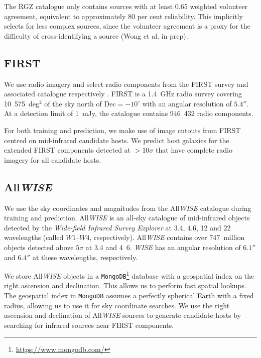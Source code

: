     The RGZ catalogue only contains sources with at least 0.65 weighted volunteer agreement, equivalent to approximately 80 per cent reliability. This implicitly selects for less complex sources, since the volunteer agreement is a proxy for the difficulty of cross-identifying a source (Wong et al. in prep).

    \subsection{FIRST} \label{sec:rlfs-first-data}

    We use radio imagery and select radio components from the FIRST survey and associated catalogue respectively \citep{white97first,helfand15first}. FIRST is a
    1.4~GHz radio survey covering 10~575~deg$^2$ of the sky north of $\mathrm{Dec} = -10^\circ$ with an angular resolution of $5.4''$. At a detection limit of $1$~mJy, the catalogue contains 946~432 radio components.

    For both training and prediction, we make use of image cutouts from FIRST centred on mid-infrared candidate hosts. We predict host galaxies for the \ncomponents{} extended FIRST components detected at $>10\sigma$ \citep[about 1.5~mJy~beam$^{-1}$, per][]{banfield15} that have complete radio imagery for all candidate hosts.

    \subsection{All\emph{WISE}} \label{sec:rlfs-wise-data}

    We use the sky coordinates and magnitudes from the All\emph{WISE} \citep{cutri2013wiseexplanatory} catalogue during training and prediction. All\emph{WISE} is an all-sky catalogue of mid-infrared objects detected by the \emph{Wide-field Infrared Survey Explorer} \citep[\emph{WISE}][]{wright10wise} at 3.4, 4.6, 12 and \unit{22}{\micro\meter} wavelengths (called $W1$--$W4$, respectively). All\emph{WISE}
    contains over 747~million objects detected above $5\sigma$ at 3.4 and
    \unit{4.6}{\micro\meter}. \emph{WISE} has an angular resolution of
    $6.1''$ and $6.4''$ at these wavelengths, respectively.

    We store All\emph{WISE} objects in a
    \texttt{MongoDB}\footnote{\url{https://www.mongodb.com/}} database with
    a geospatial index on the right ascension and declination. This allows
    us to perform fast spatial lookups. The geospatial index in
    \texttt{MongoDB} assumes a perfectly spherical Earth with a fixed radius, allowing us to use it for sky coordinate
    searches. We use the right ascension and declination of All\emph{WISE} sources to generate candidate hosts by searching for infrared sources near FIRST components.

